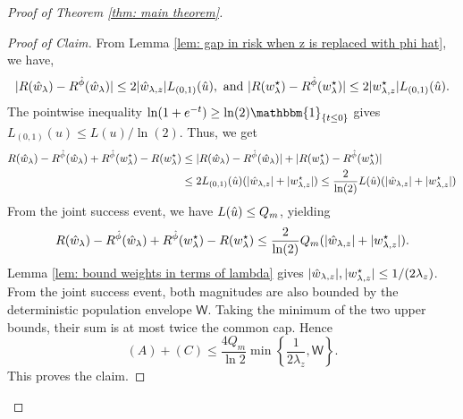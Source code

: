 \begin{proof}[Proof of Theorem \ref{thm: main theorem}]
    \begin{proof}[Proof of Claim]
        From Lemma \ref{lem: gap in risk when z is replaced with phi hat}, we have,
        \begin{equation*}
            |R(\hat{w}_\lambda) - R^{\hat{\phi}}(\hat{w}_\lambda)|
            \leq 2|\hat{w}_{\lambda,z}|L_{(0,1)}(\hat{u}),\textrm{ and }
            |R(w^\star_{\lambda}) - R^{\hat{\phi}}(w^\star_{\lambda})|
            \leq 2|w^\star_{{\lambda,z}}|L_{(0,1)}(\hat{u}).
        \end{equation*}
        The pointwise inequality
        $\ln(1+e^{-t})\geq\ln(2)\mathbbm{1}_{\{t\leq0\}}$
        gives $L_{(0,1)}(u)\leq L(u)/\ln(2)$.
        Thus, we get
        \begin{equation*}
            \begin{aligned}
                  R(\hat{w}_\lambda) - R^{\hat{\phi}}(\hat{w}_\lambda) + R^{\hat{\phi}}(w^\star_{\lambda}) - R(w^\star_{\lambda}) &\leq |R(\hat{w}_\lambda) - R^{\hat{\phi}}(\hat{w}_\lambda)| + |R(w^\star_{\lambda}) - R^{\hat{\phi}}(w^\star_{\lambda})|\\
                  &\leq 2L_{(0,1)}(\hat{u})(|\hat{w}_{\lambda,z}| + |w^\star_{{\lambda,z}}|) \leq \frac{2}{\ln(2)}L(\hat{u})(|\hat{w}_{\lambda,z}| + |w^\star_{{\lambda,z}}|)
            \end{aligned}
        \end{equation*}
        From the joint success event, we have $L(\hat{u}) \le Q_m$, yielding
        \begin{equation*}
            R(\hat{w}_\lambda) - R^{\hat{\phi}}(\hat{w}_\lambda) + R^{\hat{\phi}}(w^\star_{\lambda}) - R(w^\star_{\lambda}) \leq \frac{2}{\ln(2)}Q_m(|\hat{w}_{\lambda,z}| + |w^\star_{{\lambda,z}}|).
        \end{equation*}
        Lemma \ref{lem: bound weights in terms of lambda} gives
        $|\hat{w}_{\lambda,z}|,|w^\star_{{\lambda,z}}|\leq 1/(2\lambda_z)$.
        From the joint success event, both magnitudes are also bounded by the deterministic population envelope $\mathsf{W}$. Taking the minimum of the two upper bounds, their sum is at most twice the common cap. Hence
        \[
        (A)+(C)\leq\frac{4Q_m}{\ln2}
        \min\left\{\frac{1}{2\lambda_z},\mathsf W\right\}.
        \]
        This proves the claim.
    \end{proof}


\end{proof}
